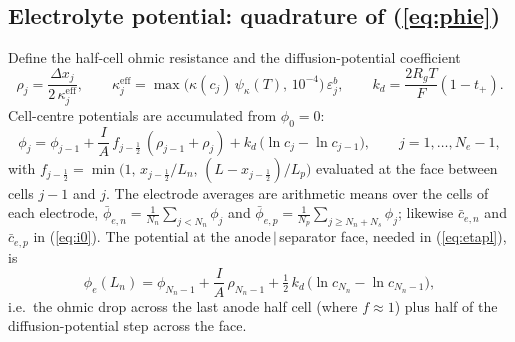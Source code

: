 \documentclass[11pt]{article}
\newcommand{\eps}{\varepsilon}
\begin{document}
\subsection{Electrolyte potential: quadrature of (\ref{eq:phie})}\label{sec:phie-num}
Define the half-cell ohmic resistance and the diffusion-potential coefficient
\begin{equation}
\rho_j=\frac{\Delta x_j}{2\,\kappa_j^{\mathrm{eff}}},\qquad
\kappa_j^{\mathrm{eff}}=\max\!\bigl(\kappa(c_j)\,\psi_\kappa(T),\,10^{-4}\bigr)\,\eps_j^{b},\qquad
k_d=\frac{2R_gT}{F}(1-t_+).
\end{equation}
Cell-centre potentials are accumulated from $\phi_0=0$:
\begin{equation}
\phi_j=\phi_{j-1}+\frac{I}{A}\,f_{j-\frac12}\,(\rho_{j-1}+\rho_j)+k_d\,\bigl(\ln c_j-\ln c_{j-1}\bigr),\qquad j=1,\dots,N_e-1,
\end{equation}
with $f_{j-\frac12}=\min\bigl(1,\,x_{j-\frac12}/L_n,\,(L-x_{j-\frac12})/L_p\bigr)$ evaluated at the face between cells $j-1$ and $j$. The electrode averages are arithmetic means over the cells of each electrode,
$\bar\phi_{e,n}=\frac{1}{N_n}\sum_{j<N_n}\phi_j$ and $\bar\phi_{e,p}=\frac{1}{N_p}\sum_{j\ge N_n+N_s}\phi_j$; likewise $\bar c_{e,n}$ and $\bar c_{e,p}$ in (\ref{eq:i0}). The potential at the anode\,$|$\,separator face, needed in (\ref{eq:etapl}), is
\begin{equation}
\phi_e(L_n)=\phi_{N_n-1}+\frac{I}{A}\,\rho_{N_n-1}+\tfrac12\,k_d\,\bigl(\ln c_{N_n}-\ln c_{N_n-1}\bigr),
\end{equation}
i.e.\ the ohmic drop across the last anode half cell (where $f\approx1$) plus half of the diffusion-potential step across the face.
\end{document}
